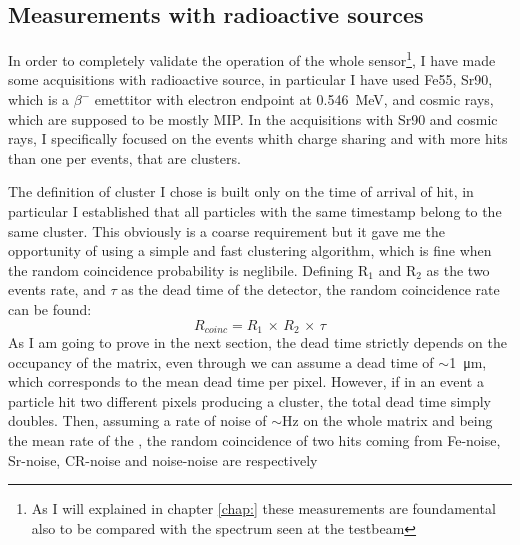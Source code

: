     \subsection{Measurements with radioactive sources}
        In order to completely validate the operation of the whole sensor\footnote{As I will explained in chapter \ref{chap:} these measurements are foundamental also to be compared with the spectrum seen at the testbeam}, I have made some acquisitions with radioactive source, in particular I have used Fe55, Sr90, which is a $\beta^-$ emettitor with electron endpoint at \SI{0.546}{MeV}, and cosmic rays, which are supposed to be mostly MIP. 
        In the acquisitions with Sr90 and cosmic rays, I specifically focused on the events whith charge sharing and with more hits than one per events, that are clusters.

        The definition of cluster I chose is built only on the time of arrival of hit, in particular I established that all particles with the same timestamp belong to the same cluster.
        This obviously is a coarse requirement but it gave me the opportunity of using a simple and fast clustering algorithm, which is fine when the random coincidence probability is neglibile. 
        Defining R$_1$ and R$_2$ as the two events rate, and $\tau$ as the dead time of the detector, the random coincidence rate can be found: 
        \begin{equation}
            R_{coinc} = R_1 \, \times\, R_2 \, \times \, \tau
        \end{equation}
        As I am going to prove in the next section, the dead time strictly depends on the occupancy of the matrix, even through we can assume a dead time of $\sim$\SI{1}{\um}, which corresponds to the mean dead time per pixel. However, if in an event a particle hit two different pixels producing a cluster, the total dead time simply doubles.   
        Then, assuming a rate of noise of $\sim$\si{Hz} on the whole matrix and being the mean rate of the , the random coincidence of two hits coming from Fe-noise, Sr-noise, CR-noise and noise-noise are respectively 
        
